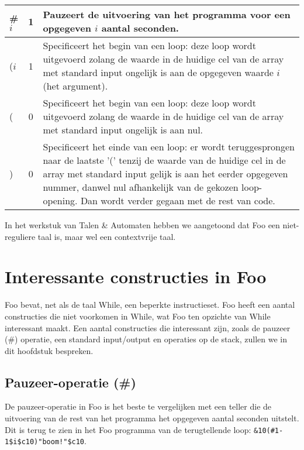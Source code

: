 \documentclass[11pt]{article}
\begin{document}
\begin{center}
\begin{tabular}{ | l | c | p{12cm} | }
    \#\(i\)                                 & 1 & Pauzeert de uitvoering van het programma voor een opgegeven \(i\) aantal seconden. \\ \hline %
    (\(i\)                                  & 1 & Specificeert het begin van een loop: deze loop wordt uitgevoerd zolang de waarde in de huidige cel van de array met standard input ongelijk is aan de opgegeven waarde \(i\) (het argument). \\ \hline
    (                                       & 0 & Specificeert het begin van een loop: deze loop wordt uitgevoerd zolang de waarde in de huidige cel van de array met standard input ongelijk is aan nul. \\ \hline
    )                                       & 0 & Specificeert het einde van een loop: er wordt teruggesprongen naar de laatste '(' tenzij de waarde van de huidige cel in de array met standard input gelijk is aan het eerder opgegeven nummer, danwel nul afhankelijk van de gekozen loop-opening. Dan wordt verder gegaan met de rest van code. \\ \hline
    \hline
    \end{tabular}
\end{center}


In het werkstuk van Talen \& Automaten hebben we aangetoond dat Foo een niet-reguliere taal is, maar wel een contextvrije taal.

\section{Interessante constructies in Foo}

Foo bevat, net als de taal While, een beperkte instructieset. 
Foo heeft een aantal constructies die niet voorkomen in While, wat Foo ten opzichte van While interessant maakt.
Een aantal constructies die interessant zijn, zoals de pauzeer (\#) operatie, een standard input/output en operaties op de stack, zullen we in dit hoofdstuk bespreken. %

\subsection{Pauzeer-operatie (\#)}
De pauzeer-operatie in Foo is het beste te vergelijken met een teller die de uitvoering van de rest van het programma het opgegeven aantal seconden uitstelt. 
Dit is terug te zien in het Foo programma van de terugtellende loop: \verb|&10(#1-1$i$c10)"boom!"$c10|.
\end{document}
